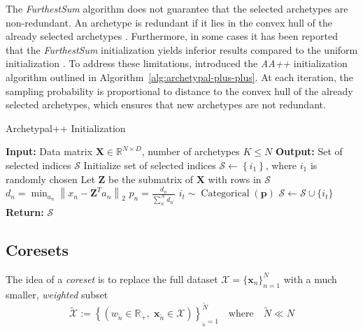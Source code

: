 \documentclass[oneside]{article}
\begin{document}
The \textit{FurthestSum} algorithm does not guarantee that the selected archetypes are non-redundant. An archetype is redundant if it lies in the convex hull of the already selected archetypes \autocite{sulemanIllconceivedInitializationArchetypal2017}. Furthermore, in some cases it has been reported that the \textit{FurthestSum} initialization yields inferior results compared to the uniform initialization \autocite{krohneClassificationSocialAnhedonia2019, olsenCombiningElectroMagnetoencephalography2022}. To address these limitations, \textcite{mairArchetypalAnalysisRethinking2024} introduced the \textit{AA++} initialization algorithm outlined in Algorithm~\ref{alg:archetypal-plus-plus}. At each iteration, the sampling probability is proportional to distance to the convex hull of the already selected archetypes, which ensures that new archetypes are not redundant.

\begin{algorithm}[H]
    \caption{Archetypal++ Initialization}
    \label{alg:archetypal-plus-plus}
    \begin{algorithmic}[1]
    \State \textbf{Input:} Data matrix $\mathbf{X} \in \mathbb{R}^{N \times D}$, number of archetypes $K \leq N$
    \State \textbf{Output:} Set of selected indices $\mathcal{S}$
    \State Initialize set of selected indices $\mathcal{S} \gets \left\{ i_1 \right\}$, where $i_1$ is randomly chosen
        \State Let $\mathbf{Z}$ be the submatrix of $\mathbf{X}$ with rows in $\mathcal{S}$
        \State $d_n = \min_{a_n} \left\| x_n - \mathbf{Z}^T a_n \right\|_2$ 
        \EndFor
            \State $p_n = \frac{d_n}{\sum_{n^\prime}^N d_{n^\prime}}$ 
        \EndFor
        \State $i_t \sim \operatorname{Categorical}(\mathbf{p})$ 
        \State $\mathcal S \gets \mathcal S \cup \{i_t\}$ 
    \EndFor
    \State \textbf{Return:} $\mathcal{S}$
    \end{algorithmic}
\end{algorithm}

\subsection{Coresets}
\label{subsec:coresets}

The idea of a \emph{coreset} is to replace the full dataset
$\mathcal{X}=\{\mathbf{x}_n\}_{n=1}^{N}$ with a much smaller, \emph{weighted} subset
\begin{equation}
    \tilde{\mathcal{X}} := \left\{(w_{\tilde{n}} \in \mathbb{R}_+, \; \mathbf{x}_{\tilde{n}} \in \mathcal{X}) \right\}_{_{\tilde{n}}=1}^{\tilde{N}} \quad \text{where} \quad \tilde{N} \ll N
\end{equation}
\end{document}
